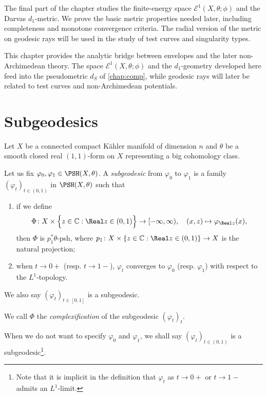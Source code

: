 The final part of the chapter studies the finite-energy space $\mathcal E^1(X,\theta;\phi)$ and the Darvas $d_1$-metric. We prove the basic metric properties needed later, including completeness and monotone convergence criteria. The radial version of the metric on geodesic rays will be used in the study of test curves and singularity types.

This chapter provides the analytic bridge between envelopes and the later non-Archimedean theory. The space $\mathcal E^1(X,\theta;\phi)$ and the $d_1$-geometry developed here feed into the pseudometric $d_S$ of \cref{chap:comp}, while geodesic rays will later be related to test curves and non-Archimedean potentials.


\section{Subgeodesics}\label{sec:subgeo}
Let $X$ be a connected compact Kähler manifold of dimension $n$ and $\theta$ be a smooth closed real $(1,1)$-form on $X$ representing a big cohomology class.

\begin{definition}\label{def:subgeod}
    Let us fix $\varphi_0,\varphi_1\in \PSH(X,\theta)$. A \emph{subgeodesic} from $\varphi_0$ to $\varphi_1$ is a family $(\varphi_t)_{t\in (0,1)}$ in $\PSH(X,\theta)$ such that
    \begin{enumerate}
        \item\label{itm:def:subgeod:1} if we define
            \[
                \Phi\colon X\times \Bigl\{z\in \mathbb{C}:\Real z\in (0,1) \Bigr\}\rightarrow [-\infty,\infty),\quad (x,z)\mapsto \varphi_{\Real z}(x),
            \]
            then $\Phi$ is $p_1^*\theta$-psh, where $p_1\colon X\times \{z\in \mathbb{C}:\Real z\in (0,1)\}\rightarrow X$ is the natural projection;
        \item\label{itm:def:subgeod:2} when $t\to 0+$ (resp. $t\to 1-$), $\varphi_t$ converges to $\varphi_0$ (resp. $\varphi_1$) with respect to the $L^1$-topology.
    \end{enumerate}
    We also say $(\varphi_t)_{t\in [0,1]}$ is a subgeodesic.

    We call $\Phi$ the \emph{complexification} of the subgeodesic $(\varphi_t)_t$.
\end{definition}
When we do not want to specify $\varphi_0$ and $\varphi_1$, we shall say $(\varphi_t)_{t\in (0,1)}$ is a subgeodesic\footnote{Note that it is implicit in the definition that $\varphi_t$ as $t\to 0+$ or $t\to 1-$ admits an $L^1$-limit.}.

